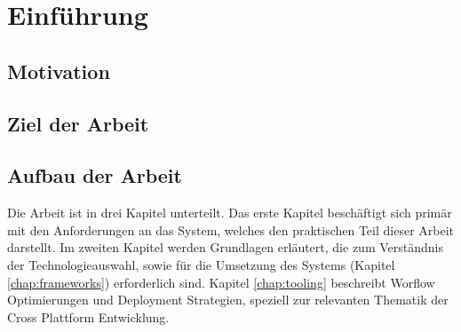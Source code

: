 
\chapter{Einführung}
\label{chap:introduction}


\section{Motivation}

\section{Ziel der Arbeit}

\section{Aufbau der Arbeit}
Die Arbeit ist in drei Kapitel unterteilt. Das erste Kapitel beschäftigt sich primär mit den
Anforderungen an das System, welches den praktischen Teil dieser Arbeit darstellt.
Im zweiten Kapitel werden Grundlagen erläutert, die zum Verständnis der Technologieauswahl,
sowie für die Umsetzung des Systems (Kapitel \ref{chap:frameworks}) erforderlich sind. Kapitel \ref{chap:tooling}
beschreibt Worflow Optimierungen und Deployment Strategien, speziell zur relevanten
Thematik der Cross Plattform Entwicklung.
